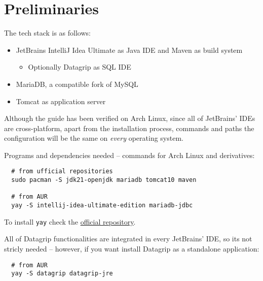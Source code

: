 \section{Preliminaries}

The tech stack is as follows:
\begin{itemize}
  \item JetBrains IntelliJ Idea Ultimate as Java IDE and Maven as build system
    \begin{itemize}
      \item Optionally Datagrip as SQL IDE
    \end{itemize}
  \item MariaDB, a compatible fork of MySQL
  \item Tomcat as application server
\end{itemize}

\begin{hint}[OS compatibility]{}
  Although the guide has been verified on Arch Linux, since all of JetBrains' IDEs are cross-platform, apart from the installation process, commands and paths the configuration will be the same on \textit{every} operating system.
\end{hint}

Programs and dependencies needed -- commands for Arch Linux and derivatives:
\begin{verbatim}
  # from ufficial repositories
  sudo pacman -S jdk21-openjdk mariadb tomcat10 maven

  # from AUR
  yay -S intellij-idea-ultimate-edition mariadb-jdbc
\end{verbatim}

To install \texttt{yay} check the \href{https://github.com/Jguer/yay?tab=readme-ov-file#installation}{official repository}.

All of Datagrip functionalities are integrated in every JetBrains' IDE, so its not stricly needed -- however, if you want install Datagrip as a standalone application:
\begin{verbatim}
  # from AUR
  yay -S datagrip datagrip-jre
\end{verbatim}
